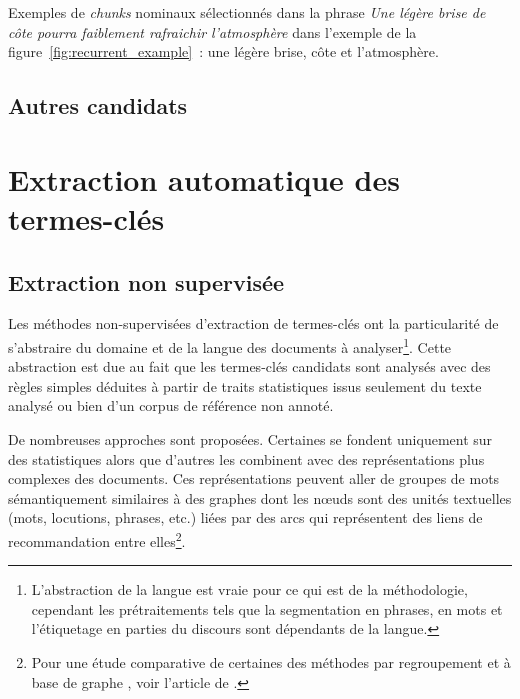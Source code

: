         Exemples de \textit{chunks} nominaux sélectionnés dans la phrase
        \textit{\og{}Une légère brise de côte pourra faiblement rafraichir
        l'atmosphère\fg{}} dans l'exemple de la
        figure~\ref{fig:recurrent_example}~: \og{}une légère brise\fg{},
        \og{}côte\fg{} et \og{}l'atmosphère\fg{}.

    \subsection{Autres candidats}
    \label{subsec:main-state_of_the_art-keyphrase_candidate_selection-other_candidates}


  \section{Extraction automatique des termes-clés}
  \label{sec:main-state_of_the_art-automatic_keyphrase_extraction}
    \subsection{Extraction non supervisée}
    \label{subsec:main-state_of_the_art-automatic_keyphrase_extraction-unsupervised_keyphrase_extraction}
      Les méthodes non-supervisées d'extraction de termes-clés ont la
      particularité de s'abstraire du domaine et de la langue des documents à
      analyser\footnote{L'abstraction de la langue est vraie pour ce qui est
      de la méthodologie, cependant les prétraitements tels que la
      segmentation en phrases, en mots et l'étiquetage en parties du discours
      sont dépendants de la langue.}. Cette abstraction est due au fait que
      les termes-clés candidats sont analysés avec des règles simples déduites
      à partir de traits statistiques issus seulement du texte analysé ou bien
      d'un corpus de référence non annoté.

      De nombreuses approches sont proposées. Certaines se fondent uniquement
      sur des statistiques alors que d'autres les combinent avec des
      représentations plus complexes des documents. Ces représentations
      peuvent aller de groupes de mots sémantiquement similaires à des graphes
      dont les n\oe{}uds sont des unités textuelles (mots, locutions, phrases,
      etc.) liées par des arcs qui représentent des liens de recommandation
      entre elles\footnote{Pour une étude comparative de certaines des
      méthodes par regroupement \cite{liu2009keycluster} et à base de graphe
      \cite{mihalcea2004textrank, wan2008expandrank}, voir l'article de
      .}.

